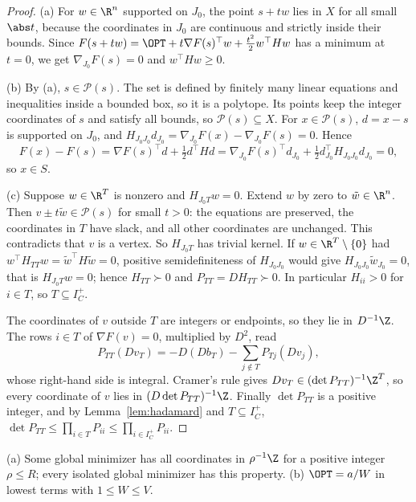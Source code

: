 \begin{proof}
(a) For $w\in\R^n$ supported on $J_0$, the point $s+tw$ lies in $X$ for all
small $\abs t$, because the coordinates in $J_0$ are continuous and strictly
inside their bounds. Since $F(s+tw)=\OPT+t\nabla F(s)^{\top}w+\frac{t^2}2w^{\top}Hw$
has a minimum at $t=0$, we get $\nabla_{J_0}F(s)=0$ and $w^{\top}Hw\ge0$.

(b) By (a), $s\in\mathcal P(s)$. The set is defined by finitely many linear
equations and inequalities inside a bounded box, so it is a polytope. Its
points keep the integer coordinates of $s$ and satisfy all bounds, so
$\mathcal P(s)\subseteq X$. For $x\in\mathcal P(s)$, $d=x-s$ is supported on
$J_0$, and $H_{J_0J_0}d_{J_0}=\nabla_{J_0}F(x)-\nabla_{J_0}F(s)=0$. Hence
\[
F(x)-F(s)=\nabla F(s)^{\top}d+\tfrac12d^{\top}Hd
=\nabla_{J_0}F(s)^{\top}d_{J_0}+\tfrac12d_{J_0}^{\top}H_{J_0J_0}d_{J_0}=0 ,
\]
so $x\in S$.

(c) Suppose $w\in\R^T$ is nonzero and $H_{J_0T}w=0$. Extend $w$ by zero to
$\tilde w\in\R^n$. Then $v\pm t\tilde w\in\mathcal P(s)$ for small $t>0$: the
equations are preserved, the coordinates in $T$ have slack, and all other
coordinates are unchanged. This contradicts that $v$ is a vertex. So
$H_{J_0T}$ has trivial kernel. If $w\in\R^T\setminus\{0\}$ had
$w^{\top}H_{TT}w=\tilde w^{\top}H\tilde w=0$, positive semidefiniteness of
$H_{J_0J_0}$ would give $H_{J_0J_0}\tilde w_{J_0}=0$, that is
$H_{J_0T}w=0$; hence $H_{TT}\succ0$ and $P_{TT}=DH_{TT}\succ0$. In
particular $H_{ii}>0$ for $i\in T$, so $T\subseteq I_C^+$.

The coordinates of $v$ outside $T$ are integers or endpoints, so they lie in
$D^{-1}\Z$. The rows $i\in T$ of $\nabla F(v)=0$, multiplied by $D^2$, read
\[
P_{TT}(Dv_T)=-D(Db_T)-\sum_{j\notin T}P_{Tj}(Dv_j),
\]
whose right-hand side is integral. Cramer's rule gives
$Dv_T\in(\det P_{TT})^{-1}\Z^T$, so every coordinate of $v$ lies in
$(D\det P_{TT})^{-1}\Z$. Finally $\det P_{TT}$ is a positive integer, and by
Lemma~\ref{lem:hadamard} and $T\subseteq I_C^+$,
$\det P_{TT}\le\prod_{i\in T}P_{ii}\le\prod_{i\in I_C^+}P_{ii}$.
\end{proof}

\begin{corollary}\label{cor:height}
(a) Some global minimizer has all coordinates in $\rho^{-1}\Z$ for a positive
integer $\rho\le R$; every isolated global minimizer has this property.
(b) $\OPT=a/W$ in lowest terms with $1\le W\le V$.
\end{corollary}

